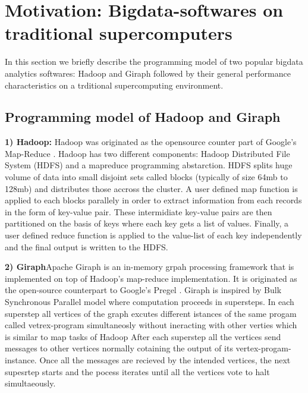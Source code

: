 \documentclass[conference]{IEEEtran}
\begin{document}
\section {Motivation: Bigdata-softwares on traditional supercomputers} \label{Bigdata Softwares on Traditional Supercomputers}
In this section we briefly describe the programming model of two popular bigdata analytics softwares: Hadoop and Giraph followed by their general performance characteristics on a trditional supercomputing environment. 
\subsection {Programming model of Hadoop and Giraph}
\textbf{1) Hadoop:}
Hadoop was originated as the opensource counter part of Google's Map-Reduce \cite{fw:mapreduce}.
Hadoop has two different components: Hadoop Distributed File System (HDFS) and a mapreduce programming abstarction.
HDFS splits huge volume of data into small disjoint sets called blocks (typically of size 64mb to 128mb) and distributes those accross the cluster.
A user defined map function is applied to each blocks parallely in order to extract information from each records in the form of key-value pair.
These intermidiate key-value pairs are then partitioned on the basis of keys where each key gets a list of values.
Finally, a user defined reduce function is applied to the value-list of each key independently and the final output is written to the HDFS.
 
\textbf{2) Giraph}Apache Giraph is an in-memory grpah processing framework that is implemented on top of Hadoop's map-reduce implementation.
It is originated as the open-source counterpart to Google's Pregel \cite{fw:pregel}.
Giraph is inspired by Bulk Synchronous Parallel model \cite{fw:bsp} where computation proceeds in supersteps.
In each superstep all vertices of the graph excutes different istances of the same progam called vetrex-program simultaneosly without ineracting with other verties which is similar to map tasks of Hadoop
After each superstep all the vertices send messages to other vertices normally cotaining the output of its vertex-progam-instance.
Once all the messages are recieved by the intended vertices, the next supesrtep starts and the pocess iterates until all the vertices vote to halt simultaeously.
\end{document}
